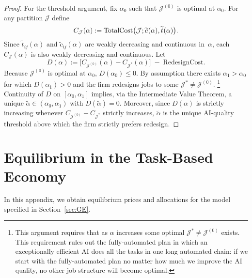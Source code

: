\documentclass{article}
\theoremstyle{plain}
\theoremstyle{plain}
\begin{document}
\begin{proof}
For the threshold argument, fix $\alpha_0$ such that $\mathcal{J}^{(0)}$ is optimal at $\alpha_0$.
For any partition $\mathcal{J}$ define
\[
C_{\mathcal{J}}(\alpha)
:=
\mathrm{TotalCost}\bigl(\mathcal{J}; \widetilde{c_{}}(\alpha), \widetilde{t_{}}(\alpha)\bigr).
\]
Since $\widetilde t_{ij}(\alpha)$ and $\widetilde c_{ij}(\alpha)$ are weakly decreasing and continuous in~$\alpha$, each $C_{\mathcal{J}}(\alpha)$ is also weakly decreasing and continuous.
Let
\[
D(\alpha)
:=
\bigl[C_{\mathcal{J}^{(0)}}(\alpha)-C_{\mathcal{J}^*}(\alpha)\bigr]
\;-\;
\mathrm{RedesignCost}.
\]
Because $\mathcal{J}^{(0)}$ is optimal at $\alpha_0$, $D(\alpha_0)\le0$.  
By assumption there exists $\alpha_1>\alpha_0$ for which $D(\alpha_1)>0$ and the firm redesigns jobs to some $\mathcal{J}^{*} \neq \mathcal{J}^{(0)}$.  
\footnote{This argument requires that as $\alpha$ increases some optimal $\mathcal{J}^{*} \neq \mathcal{J}^{(0)}$ exists.
This requirement rules out the fully-automated plan in which an exceptionally efficient AI does all the tasks in one long automated chain: if we start with the fully-automated plan no matter how much we improve the AI quality, no other job structure will become optimal.}
Continuity of $D$ on $[\alpha_0,\alpha_1]$ implies, via the Intermediate Value Theorem, a unique $\tilde\alpha\in(\alpha_0,\alpha_1)$ with $D(\tilde\alpha)=0$.  
Moreover, since $D(\alpha)$ is strictly increasing whenever $C_{\mathcal{J}^{(0)}}-C_{\mathcal{J}^*}$ strictly increases, $\tilde\alpha$ is the unique AI‐quality threshold above which the firm strictly prefers redesign.
\end{proof}




\section{Equilibrium in the Task-Based Economy}
\label{app:GE}

In this appendix, we obtain equilibrium prices and allocations for the model specified in Section~\ref{sec:GE}.
\end{document}
